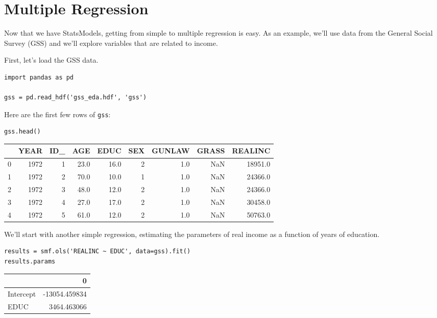 \hypertarget{multiple-regression}{%
\section{Multiple Regression}\label{multiple-regression}}

Now that we have StatsModels, getting from simple to multiple regression
is easy. As an example, we'll use data from the General Social Survey
(GSS) and we'll explore variables that are related to income.

First, let's load the GSS data.

\begin{lstlisting}[]
import pandas as pd

gss = pd.read_hdf('gss_eda.hdf', 'gss')
\end{lstlisting}

Here are the first few rows of \passthrough{\lstinline!gss!}:

\begin{lstlisting}[]
gss.head()
\end{lstlisting}

\begin{tabular}{lrrrrrrrr}
\midrule
{} &  YEAR &  ID\_ &   AGE &  EDUC &  SEX &  GUNLAW &  GRASS &  REALINC \\
\midrule
0 &  1972 &    1 &  23.0 &  16.0 &    2 &     1.0 &    NaN &  18951.0 \\
1 &  1972 &    2 &  70.0 &  10.0 &    1 &     1.0 &    NaN &  24366.0 \\
2 &  1972 &    3 &  48.0 &  12.0 &    2 &     1.0 &    NaN &  24366.0 \\
3 &  1972 &    4 &  27.0 &  17.0 &    2 &     1.0 &    NaN &  30458.0 \\
4 &  1972 &    5 &  61.0 &  12.0 &    2 &     1.0 &    NaN &  50763.0 \\
\midrule
\end{tabular}

We'll start with another simple regression, estimating the parameters of
real income as a function of years of education.

\begin{lstlisting}[]
results = smf.ols('REALINC ~ EDUC', data=gss).fit()
results.params
\end{lstlisting}

\begin{tabular}{lr}
\midrule
{} &             0 \\
\midrule
Intercept & -13054.459834 \\
EDUC      &   3464.463066 \\
\midrule
\end{tabular}

